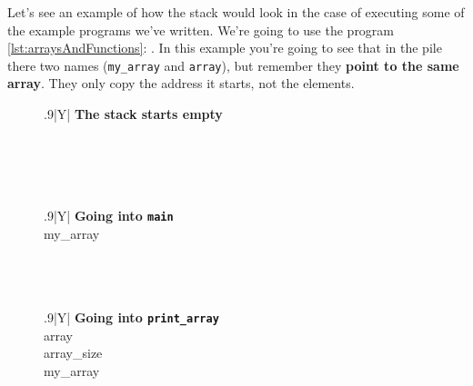 \documentclass[a4paper]{article}
\begin{document}
Let's see an example of how the stack would look in the case of executing some
of the example programs we've written. We're going to use the program
\ref{lst:arraysAndFunctions}: .
In this example you're going to see that in the pile there two names
(\verb!my_array! and \verb!array!), but remember they \textbf{point to the same
array}. They only copy the address it starts, not the elements.
\begin{table}[H]
\centering
    \begin{subfigure}{0.33333\linewidth}
        \centering
        \begin{tabularx}{.9\linewidth}{|Y|}
        \hline
        \textbf{The stack starts empty}\\\hline
         \\\hline
        \\ \hline
        \\ \hline
        \\ \hline
        \end{tabularx}
    \end{subfigure}%
    \begin{subfigure}{0.33333\linewidth}
        \centering
        \begin{tabularx}{.9\linewidth}{|Y|}
        \hline
        \textbf{Going into \texttt{main}}\\\hline
        my\_array\\\hline
        \\ \hline
        \\ \hline
        \\ \hline
        \end{tabularx}
    \end{subfigure}%
    \begin{subfigure}{0.33333\linewidth}
        \centering
        \begin{tabularx}{.9\linewidth}{|Y|}
        \hline
        \textbf{Going into \texttt{print\_array}}\\\hline
        array\\\hline
        array\_size\\\hline
        my\_array\\\hline
        \\ \hline
        \end{tabularx}
    \end{subfigure}%



\end{table}
\end{document}
